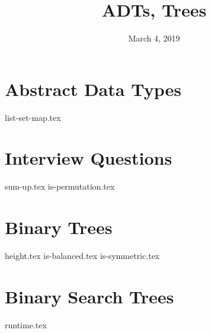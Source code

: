 \documentclass[11pt]{exam}
\title{ADTs, Trees}
\date{March 4, 2019}
\begin{document}
\maketitle

\section{Abstract Data Types}
{list-set-map.tex}

\clearpage

\section{Interview Questions}
\begin{questions}
{sum-up.tex}
{is-permutation.tex}
\end{questions}

\clearpage

\section{Binary Trees}
\begin{questions}
{height.tex}
{is-balanced.tex}
{is-symmetric.tex}
\clearpage
\end{questions}

\clearpage

\section{Binary Search Trees}
\begin{questions}
{runtime.tex}
\newline \newline 
\end{questions}

\clearpage
\end{document}
